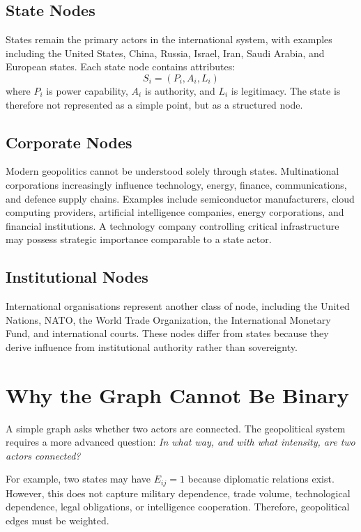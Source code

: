 \documentclass[11pt,openany]{book}
\theoremstyle{plain}
\theoremstyle{definition}
\begin{document}
\subsection*{State Nodes}

States remain the primary actors in the international system, with examples including the United States, China, Russia, Israel, Iran, Saudi Arabia, and European states. Each state node contains attributes:
\[
S_i = (P_i, A_i, L_i)
\]
where \(P_i\) is power capability, \(A_i\) is authority, and \(L_i\) is legitimacy. The state is therefore not represented as a simple point, but as a structured node.

\subsection*{Corporate Nodes}

Modern geopolitics cannot be understood solely through states. Multinational corporations increasingly influence technology, energy, finance, communications, and defence supply chains. Examples include semiconductor manufacturers, cloud computing providers, artificial intelligence companies, energy corporations, and financial institutions. A technology company controlling critical infrastructure may possess strategic importance comparable to a state actor.

\subsection*{Institutional Nodes}

International organisations represent another class of node, including the United Nations, NATO, the World Trade Organization, the International Monetary Fund, and international courts. These nodes differ from states because they derive influence from institutional authority rather than sovereignty.

\section*{Why the Graph Cannot Be Binary}

A simple graph asks whether two actors are connected. The geopolitical system requires a more advanced question: \textit{In what way, and with what intensity, are two actors connected?}

For example, two states may have \(E_{ij} = 1\) because diplomatic relations exist. However, this does not capture military dependence, trade volume, technological dependence, legal obligations, or intelligence cooperation. Therefore, geopolitical edges must be weighted.
\end{document}
